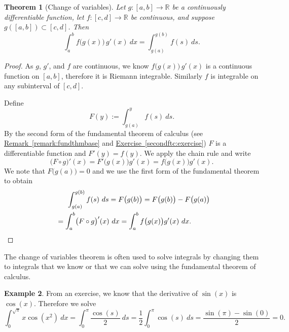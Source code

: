 \documentclass[12pt]{book}
\newcommand{\R}{{\mathbb{R}}}
\theoremstyle{plain}
\newtheorem{thm}{Theorem}[section]
\theoremstyle{remark}
\theoremstyle{definition}
\theoremstyle{exercise}
\theoremstyle{example}
\newtheorem{example}[thm]{Example}
\newcommand{\exerciseref}[1]{\hyperref[#1]{Exercise~\ref*{#1}}}
\newcommand{\remarkref}[1]{\hyperref[#1]{Remark~\ref*{#1}}}
\begin{document}
\begin{thm}[Change of variables]
Let $g \colon [a,b] \to \R$ be a continuously differentiable function,
let $f \colon [c,d] \to \R$ be continuous, and suppose
$g([a,b]) \subset [c,d]$.  Then
\begin{equation*}
\int_a^b f\bigl(g(x)\bigr)\, g'(x)~ dx =
\int_{g(a)}^{g(b)} f(s)~ ds .
\end{equation*}
\end{thm}

\begin{proof}
As $g$, $g'$, and $f$ are continuous, we know $f\bigl(g(x)\bigr)\,g'(x)$
is a continuous function on $[a,b]$, therefore it is Riemann integrable.
Similarly $f$ is integrable on any subinterval of $[c,d]$.

Define 
\begin{equation*}
F(y) := \int_{g(a)}^{y} f(s)~ds .
\end{equation*}
By the second form of the fundamental
theorem of calculus (see \remarkref{remark:fundthmbase} and \exerciseref{secondftc:exercise})
$F$ is a differentiable function and $F'(y) = f(y)$.  We apply the chain
rule and write
\begin{equation*}
\bigl( F \circ g \bigr)' (x) =
F'\bigl(g(x)\bigr) g'(x)
=
f\bigl(g(x)\bigr) g'(x) .
\end{equation*}
We note that $F\bigl(g(a)\bigr) = 0$ and we
use the first form of the fundamental theorem
to obtain
\begin{multline*}
\qquad %
\int_{g(a)}^{g(b)} f(s)~ds = F\bigl(g(b)\bigr) = F\bigl(g(b)\bigr)-F\bigl(g(a)\bigr)
\\
=
\int_a^b 
\bigl( F \circ g \bigr)' (x) ~dx
=
\int_a^b 
f\bigl(g(x)\bigr) g'(x)
~dx .
\qquad %
\qedhere
\end{multline*}
\end{proof}

The change of variables theorem is often used to solve integrals by changing them
to integrals that we know or that we can solve using the fundamental theorem of
calculus.

\begin{example}
From an exercise, we know that the derivative of $\sin(x)$ is $\cos(x)$.
Therefore we solve
\begin{equation*}
\int_0^{\sqrt{\pi}} x \cos(x^2) ~ dx = \int_0^\pi \frac{\cos(s)}{2} ~ ds
=
\frac{1}{2}
\int_0^\pi \cos(s) ~ ds
=
\frac{
\sin(\pi) - \sin(0)
}{2}
=
0 .
\end{equation*}
\end{example}
\end{document}
